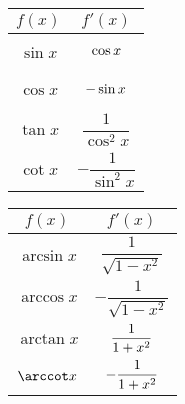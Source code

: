 \begin{blueBox}
\begin{minipage}{0.45\textwidth}
\begin{center}
    \end{center}
  \end{minipage}%
  \begin{minipage}{0.275\textwidth}
    \def\arraystretch{1.5}
    \begin{tabular}{c | c}
      $f(x)$   & $f'(x)$                                      \\ \toprule
      $\sin x$ & $\cos x \vphantom{\dfrac{1}{\sqrt{1-x^2}}}$  \\ [2mm]
      $\cos x$ & $-\sin x \vphantom{\dfrac{1}{\sqrt{1-x^2}}}$ \\ [2mm]
      $\tan x$ & $\dfrac{1}{\cos^2 x}$                        \\ [2mm]
      $\cot x$ & $-\dfrac{1}{\sin^2 x}$                       \\ \bottomrule
    \end{tabular}
  \end{minipage}%
  \begin{minipage}{0.275\textwidth}
    \def\arraystretch{1.5}
    \begin{tabular}{c | c}
      $f(x)$      & $f'(x)$                               \\ \toprule
      $\arcsin x$ & $\dfrac{1}{\sqrt{1-x^2}}$             \\ [2mm]
      $\arccos x$ & $-\dfrac{1}{\sqrt{1-x^2}}$            \\ [2mm]
      $\arctan x$ & $\dfrac{1}{1+x^2 \vphantom{\cos^2}}$  \\ [2mm]
      $\arccot x$ & $-\dfrac{1}{1+x^2 \vphantom{\sin^2}}$ \\ \bottomrule
    \end{tabular}
  \end{minipage}
\end{blueBox}

